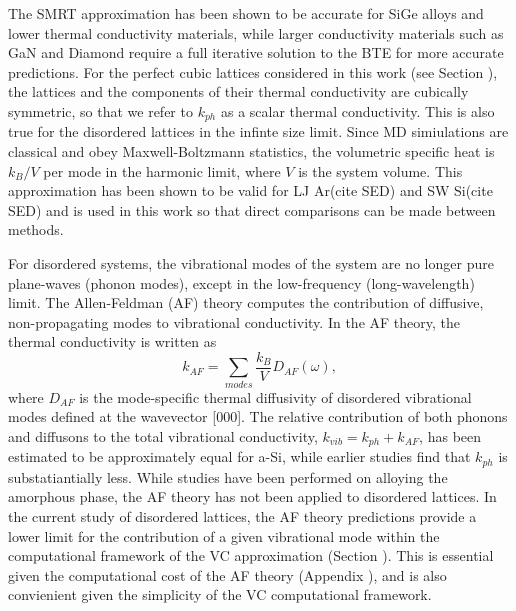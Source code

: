 \documentclass[aps,prb,twocolumn,superscriptaddress,amsmath,amssymb,floatfix]{revtex4}
\begin{document}
The SMRT approximation has been shown to be accurate for SiGe alloys  
and lower thermal conductivity materials, while larger conductivity 
materials such as GaN and Diamond require a full 
iterative solution to the BTE for more accurate predictions.
\cite{garg_role_2011,lindsay_thermal_2012,ward_intrinsic_2010} 
For the perfect cubic lattices considered in this 
work (see Section ), the lattices and the components of their 
thermal conductivity are cubically symmetric, so that we refer to 
$k_{ph}$ as a scalar thermal conductivity. 
This is also true for the disordered lattices 
in the infinte size limit. 
Since MD simiulations are classical 
and obey Maxwell-Boltzmann 
statistics,\cite{mcquarrie_statistical_2000} the volumetric 
specific heat is $k_{B}/V$ per mode in the harmonic limit, where $V$ 
is the system volume. This approximation has been shown to be valid 
for LJ Ar(cite SED) and SW Si(cite SED) 
and is used 
in this work so that direct comparisons can be made between methods.

For disordered systems, the vibrational modes of the system are no 
longer pure plane-waves (phonon modes), except in the low-frequency 
(long-wavelength) limit. The Allen-Feldman (AF) theory computes 
the contribution of diffusive, non-propagating modes to vibrational 
conductivity.\cite{allen_thermal_1993} 
In the AF theory, the thermal conductivity is written as
\begin{equation}\label{EQ:M:k_AF}
k_{AF} = \sum_{modes} \frac{k_{B}}{V} D_{AF}(\omega),
\end{equation}
where $D_{AF}$ is the mode-specific thermal diffusivity of  
disordered vibrational modes defined at the wavevector [000].   
The relative contribution of both
phonons and diffusons to the total vibrational 
conductivity, $k_{vib} = k_{ph} + k_{AF}$, has been estimated 
to be approximately equal for a-Si,\cite{he_heat_2011} while earlier 
studies find that $k_{ph}$ is substatiantially less.
\cite{feldman_numerical_1999} 
While studies have been performed on alloying the amorphous phase, the 
AF theory has not been applied to disordered lattices.
\cite{feldman_thermal_1993} In the current study of disordered lattices, 
the AF theory predictions provide a lower limit for the contribution 
of a given vibrational mode within the computational 
framework of the VC approximation (Section ). This is essential given 
the computational cost of the AF theory (Appendix ), and is also 
convienient given the simplicity of the VC computational framework. 

\end{document}

